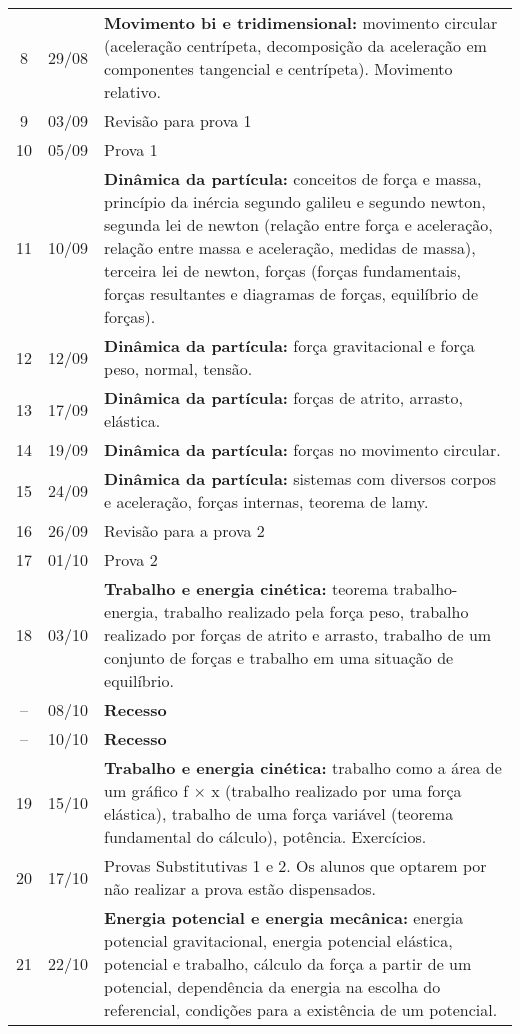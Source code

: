 \begin{center}
\begin{longtable}{ccp{70mm}}
  8 & 29/08 & \textbf{Movimento bi e tridimensional:} movimento circular (aceleração centrípeta, decomposição da aceleração em componentes tangencial e centrípeta). Movimento relativo.\\
  9 & 03/09 & Revisão para prova 1\\
 10 & 05/09 & Prova 1\\
 11 & 10/09 & \textbf{Dinâmica da partícula:} conceitos de força e massa, princípio da inércia segundo galileu e segundo newton, segunda lei de newton (relação entre força e aceleração, relação entre massa e aceleração, medidas de massa), terceira lei de newton, forças (forças fundamentais, forças resultantes e diagramas de forças, equilíbrio de forças).\\
 12 & 12/09 & \textbf{Dinâmica da partícula:} força gravitacional e força peso, normal, tensão.\\
 13 & 17/09 & \textbf{Dinâmica da partícula:} forças de atrito, arrasto, elástica.\\
 14 & 19/09 & \textbf{Dinâmica da partícula:} forças no movimento circular.\\
 15 & 24/09 & \textbf{Dinâmica da partícula:} sistemas com diversos corpos e aceleração, forças internas, teorema de lamy.\\
 16 & 26/09 & Revisão para a prova 2\\
 17 & 01/10 & Prova 2\\
 18 & 03/10 & \textbf{Trabalho e energia cinética:} teorema trabalho-energia, trabalho realizado pela força peso, trabalho realizado por forças de atrito e arrasto, trabalho de um conjunto de forças e trabalho em uma situação de equilíbrio.\\
 -- & 08/10 & \textbf{Recesso}\\
 -- & 10/10 & \textbf{Recesso} \\
 19 & 15/10 & \textbf{Trabalho e energia cinética:} trabalho como a área de um gráfico f × x (trabalho realizado por uma força elástica), trabalho de uma força variável (teorema fundamental do cálculo), potência. Exercícios.\\
 20 & 17/10 & Provas Substitutivas 1 e 2. Os alunos que optarem por não realizar a prova estão dispensados.\\
 21 & 22/10 & \textbf{Energia potencial e energia mecânica:} energia potencial gravitacional, energia potencial elástica, potencial e trabalho, cálculo da força a partir de um potencial, dependência da energia na escolha do referencial, condições para a existência de um potencial.\\

\end{longtable}
\end{center}
